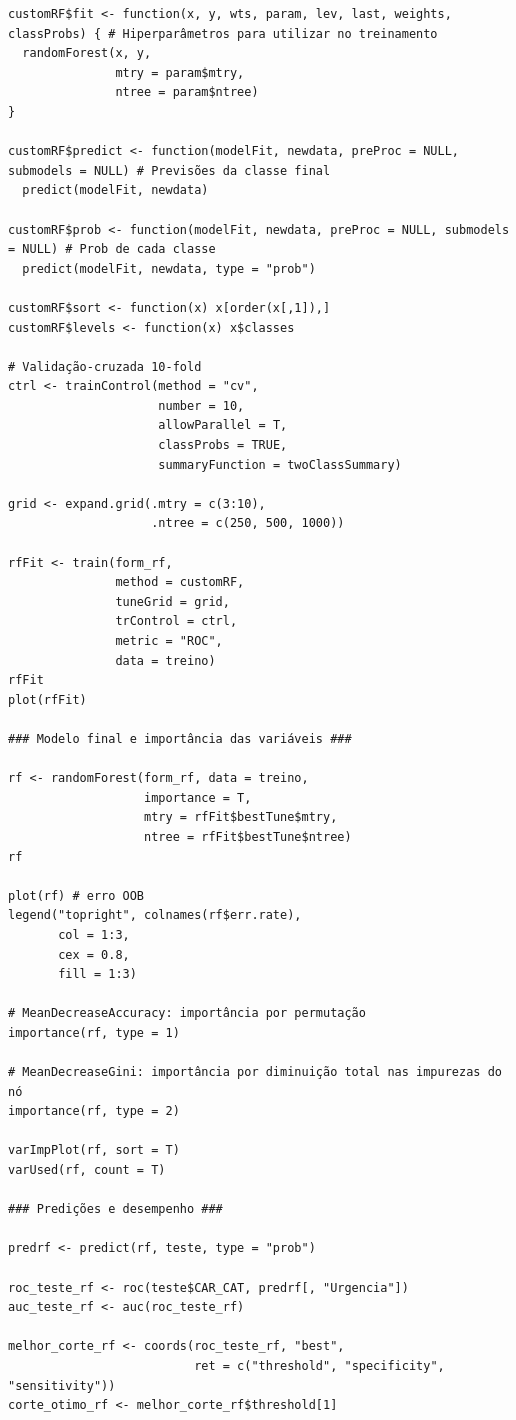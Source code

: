 \documentclass[12pt,a4paper]{article}
\begin{document}
\begin{lstlisting}[style=Rstyle, caption={Script R utilizado nas análises (\texttt{trabalhoEndometriose.R}).}]
customRF$fit <- function(x, y, wts, param, lev, last, weights, classProbs) { # Hiperparâmetros para utilizar no treinamento
  randomForest(x, y,
               mtry = param$mtry,
               ntree = param$ntree)
}

customRF$predict <- function(modelFit, newdata, preProc = NULL, submodels = NULL) # Previsões da classe final
  predict(modelFit, newdata)

customRF$prob <- function(modelFit, newdata, preProc = NULL, submodels = NULL) # Prob de cada classe
  predict(modelFit, newdata, type = "prob")

customRF$sort <- function(x) x[order(x[,1]),]
customRF$levels <- function(x) x$classes

# Validação-cruzada 10-fold
ctrl <- trainControl(method = "cv",
                     number = 10,
                     allowParallel = T,
                     classProbs = TRUE,
                     summaryFunction = twoClassSummary)

grid <- expand.grid(.mtry = c(3:10),
                    .ntree = c(250, 500, 1000))

rfFit <- train(form_rf,
               method = customRF,
               tuneGrid = grid,
               trControl = ctrl,
               metric = "ROC",
               data = treino)
rfFit
plot(rfFit)

### Modelo final e importância das variáveis ###

rf <- randomForest(form_rf, data = treino,
                   importance = T,
                   mtry = rfFit$bestTune$mtry,
                   ntree = rfFit$bestTune$ntree)
rf

plot(rf) # erro OOB
legend("topright", colnames(rf$err.rate),
       col = 1:3,
       cex = 0.8,
       fill = 1:3)

# MeanDecreaseAccuracy: importância por permutação
importance(rf, type = 1)

# MeanDecreaseGini: importância por diminuição total nas impurezas do nó
importance(rf, type = 2)

varImpPlot(rf, sort = T)
varUsed(rf, count = T)

### Predições e desempenho ###

predrf <- predict(rf, teste, type = "prob")

roc_teste_rf <- roc(teste$CAR_CAT, predrf[, "Urgencia"])
auc_teste_rf <- auc(roc_teste_rf)

melhor_corte_rf <- coords(roc_teste_rf, "best",
                          ret = c("threshold", "specificity", "sensitivity"))
corte_otimo_rf <- melhor_corte_rf$threshold[1]


\end{lstlisting}
\end{document}
